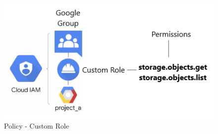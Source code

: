 \begin{figure}[h]
\centering
\includegraphics[width=\linewidth]{sto-cus}
\caption {Policy - Custom Role}
 \label{fig:sto-cus}
\end{figure}

